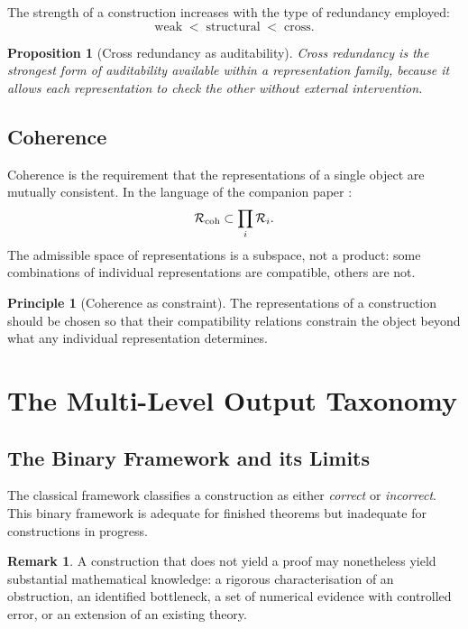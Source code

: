 \documentclass[11pt,a4paper]{article}
\theoremstyle{definition}
\newtheorem{principle}[definition]{Principle}
\newtheorem{remark}[definition]{Remark}
\theoremstyle{plain}
\newtheorem{proposition}[definition]{Proposition}
\newcommand{\Rcal}{\mathcal{R}}
\begin{document}
The strength of a construction increases with the type of
redundancy employed:
\[
  \text{weak} \;<\; \text{structural} \;<\; \text{cross}.
\]

\begin{proposition}[Cross redundancy as auditability]\label{pr:cross-audit}
Cross redundancy is the strongest form of auditability available
within a representation family, because it allows each
representation to check the other without external intervention.
\end{proposition}

\subsection{Coherence}

Coherence is the requirement that the representations of a single
object are mutually consistent. In the language of the companion
paper \cite{paperII}:
\[
  \Rcal_{\rm coh} \subset \prod_i \Rcal_i .
\]
The admissible space of representations is a subspace, not a
product: some combinations of individual representations are
compatible, others are not.

\begin{principle}[Coherence as constraint]\label{pr:coherence}
The representations of a construction should be chosen so that
their compatibility relations constrain the object beyond what any
individual representation determines.
\end{principle}

\section{The Multi-Level Output Taxonomy}
\label{sec:taxonomy}

\subsection{The Binary Framework and its Limits}

The classical framework classifies a construction as either
\emph{correct} or \emph{incorrect}. This binary framework is
adequate for finished theorems but inadequate for constructions in
progress.

\begin{remark}
A construction that does not yield a proof may nonetheless yield
substantial mathematical knowledge: a rigorous characterisation of
an obstruction, an identified bottleneck, a set of numerical
evidence with controlled error, or an extension of an existing
theory.
\end{remark}
\end{document}
